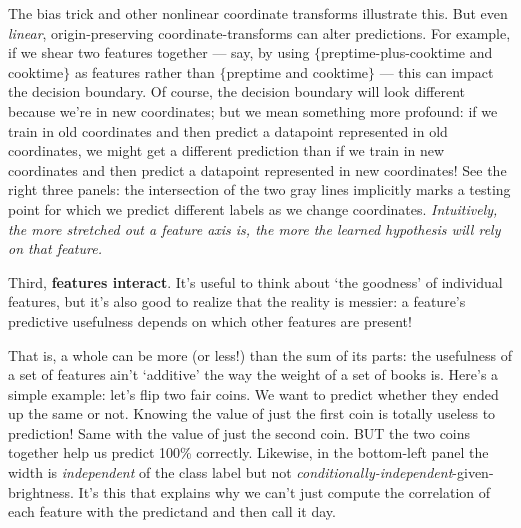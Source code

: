   The bias trick and other nonlinear coordinate transforms illustrate this.
  But even \emph{linear}, origin-preserving coordinate-transforms can alter
  predictions.
  For example, if we shear two features together --- say, by using
  $\{$preptime-plus-cooktime and cooktime$\}$ as features rather than
  $\{$preptime and cooktime$\}$ --- this can impact the decision boundary.
  Of course, the decision boundary will look different because we're in
  new coordinates; but we mean something more profound:
    if we train in old coordinates and then predict a datapoint represented in old coordinates,
  we might get a different prediction than
    if we train in new coordinates and then predict a datapoint represented in new coordinates!
  See the right three panels:
  the intersection of the two {\gre gray lines} implicitly marks
  a testing point for which we predict different labels
  as we
  change
  coordinates.
  \emph{Intuitively, the more stretched out a feature axis is, the more the
  learned hypothesis will rely on that feature.}

  Third, \textbf{features interact}.
  It's useful to think about `the goodness' of individual features,
  but it's also good to realize that the reality is messier: a feature's
  predictive usefulness depends on which other features are present!

  That is, a whole can be more (or less!) than the sum of its parts: the
  usefulness of a set of features ain't `additive' the way the weight of a set
  of books is.  Here's a simple example: let's flip two fair coins.  We want to
  predict whether they ended up the same or not.  Knowing the value of just the
  first coin is totally useless to prediction!  Same with the value of just the
  second coin.  BUT the two coins together help us predict 100\% correctly.
  Likewise, in the bottom-left panel the width is \emph{independent} of the
  class label but not \emph{conditionally-independent}-given-brightness.
  It's this that explains why we can't just compute the correlation of each
  feature with the predictand and then call it day.





